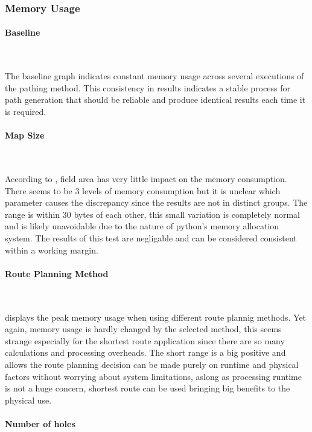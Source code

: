 \documentclass[final]{cmpreport_02}
\begin{document}
\subsubsection{Memory Usage}

\paragraph{Baseline} \

The baseline graph  indicates constant memory usage across several executions of the pathing method.
This consistency in results indicates a stable process for path generation that should be reliable and produce identical results each time it is required.

\paragraph{Map Size} \

According to , field area has very little impact on the memory consumption.
There seems to be 3 levels of memory consumption but it is unclear which parameter causes the discrepancy since the results are not in distinct groups.
The range is within 30 bytes of each other, this small variation is completely normal and is likely unavoidable due to the nature of python's memory allocation system.
The results of this test are negligable and can be considered consistent within a working margin.



\paragraph{Route Planning Method} \

 displays the peak memory usage when using different route plannig methods. Yet again, memory usage is hardly changed by the selected method, this seems strange especially for the shortest route application since there are so many calculations and processing overheads.
The short range is a big positive and allows the route planning decision can be made purely on runtime and physical factors without worrying about system limitations, aslong as processing runtime is not a huge concern, shortest route can be used bringing big benefits to the physical use.



\paragraph{Number of holes} \
\end{document}
